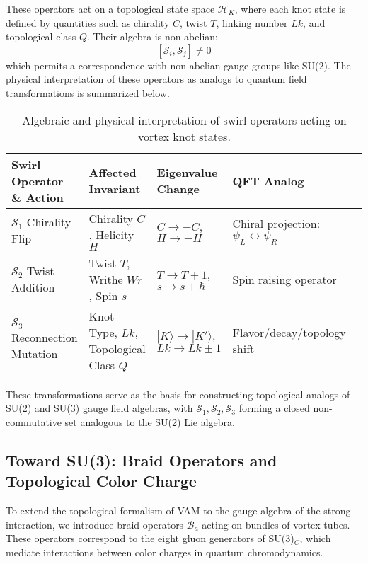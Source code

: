 These operators act on a topological state space $\mathcal{H}_K$, where each knot state is defined by quantities such as chirality $C$, twist $T$, linking number $Lk$, and topological class $Q$. Their algebra is non-abelian:
\[
[\mathcal{S}_i, \mathcal{S}_j] \neq 0
\]
which permits a correspondence with non-abelian gauge groups like SU(2). The physical interpretation of these operators as analogs to quantum field transformations is summarized below.

\begin{table}[H]
    \centering
    \scriptsize
    \renewcommand{\arraystretch}{1.4}
    \begin{tabular}{|l|l|l|l|l|}
        \hline
        \textbf{Swirl Operator \& Action} & \textbf{Affected Invariant} & \textbf{Eigenvalue Change} & \textbf{QFT Analog} \\
        \hline
        $\mathcal{S}_1$ Chirality Flip & Chirality $C$, Helicity $H$ & $C \rightarrow -C$, $H \rightarrow -H$ & Chiral projection: $\psi_L \leftrightarrow \psi_R$ \\
        \hline
        $\mathcal{S}_2$ Twist Addition & Twist $T$, Writhe $Wr$, Spin $s$ & $T \rightarrow T + 1$, $s \rightarrow s + \hbar$ & Spin raising operator \\
        \hline
        $\mathcal{S}_3$ Reconnection Mutation & Knot Type, $Lk$, Topological Class $Q$ & $|K\rangle \rightarrow |K'\rangle$, $Lk \rightarrow Lk \pm 1$ & Flavor/decay/topology shift \\
        \hline
    \end{tabular}
    \caption{Algebraic and physical interpretation of swirl operators acting on vortex knot states.}
\end{table}

These transformations serve as the basis for constructing topological analogs of SU(2) and SU(3) gauge field algebras, with $\mathcal{S}_1, \mathcal{S}_2, \mathcal{S}_3$ forming a closed non-commutative set analogous to the SU(2) Lie algebra.

\subsection{Toward SU(3): Braid Operators and Topological Color Charge}

To extend the topological formalism of VAM to the gauge algebra of the strong interaction, we introduce braid operators $\mathcal{B}_a$ acting on bundles of vortex tubes. These operators correspond to the eight gluon generators of SU(3)$_C$, which mediate interactions between color charges in quantum chromodynamics.

